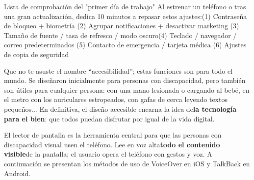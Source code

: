 \begin{tcbinfo}{Lista de comprobación del "primer día de trabajo"}
Al estrenar un teléfono o tras una gran actualización, dedica 10 minutos a repasar estos ajustes:\newline (1) Contraseña de bloqueo + biometría (2) Agrupar notificaciones + desactivar marketing (3) Tamaño de fuente / tasa de refresco / modo oscuro\newline (4) Teclado / navegador / correo predeterminados (5) Contacto de emergencia / tarjeta médica (6) Ajustes de copia de seguridad

\end{tcbinfo}


Que no te asuste el nombre “accesibilidad”; estas funciones son para todo el mundo. Se diseñaron inicialmente para personas con discapacidad, pero también son útiles para cualquier persona: con una mano lesionada o cargando al bebé, en el metro con los auriculares estropeados, con gafas de cerca leyendo textos pequeños... En definitiva, el diseño accesible encarna la idea de\textbf{la tecnología para el bien}: que todos puedan disfrutar por igual de la vida digital.


El lector de pantalla es la herramienta central para que las personas con discapacidad visual usen el teléfono. Lee en voz alta\textbf{todo el contenido visible}de la pantalla; el usuario opera el teléfono con gestos y voz. A continuación se presentan los métodos de uso de VoiceOver en iOS y TalkBack en Android.

